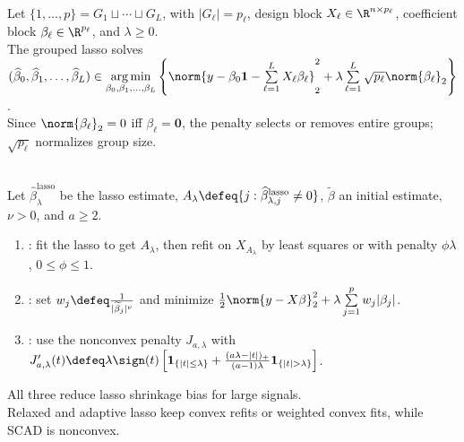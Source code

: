 \begin{method} \label{meth:sl-grouped-lasso} \\
Let $\{1,\ldots,p\}=G_1\sqcup\cdots\sqcup G_L$, with $|G_\ell|=p_\ell$, design block $X_\ell\in\R^{n\times p_\ell}$, coefficient block $\beta_\ell\in\R^{p_\ell}$, and $\lambda\geq0$.\\
The grouped lasso solves $(\widehat{\beta}_0,\widehat{\beta}_1,\ldots,\widehat{\beta}_L)\in\operatorname*{arg\,min}\limits_{\beta_0,\beta_1,\ldots,\beta_L} \left\{ \norm{y-\beta_0\mathbf{1}-\sum\limits_{\ell=1}^{L}X_\ell\beta_\ell}_2^2 +\lambda\sum\limits_{\ell=1}^{L}\sqrt{p_\ell}\norm{\beta_\ell}_2 \right\}$.\\
Since $\norm{\beta_\ell}_2=0$ iff $\beta_\ell=\mathbf{0}$, the penalty selects or removes entire groups; $\sqrt{p_\ell}$ normalizes group size.
\end{method}

\begin{method} \label{meth:sl-relaxed-adaptive-and-nonconvex-lasso-variants} \\
Let $\widehat{\beta}^{\mathrm{lasso}}_\lambda$ be the lasso estimate, $A_\lambda\defeq\{j:\widehat{\beta}^{\mathrm{lasso}}_{\lambda,j}\neq0\}$, $\widetilde{\beta}$ an initial estimate, $\nu>0$, and $a\geq2$.
\begin{enumerate}[label=(\roman*)]
\setlength{\itemsep}{0pt}
\item {}: fit the lasso to get $A_\lambda$, then refit on $X_{A_\lambda}$ by least squares or with penalty $\phi\lambda$, $0\leq\phi\leq1$.
\item {}: set $w_j\defeq\frac{1}{|\widetilde{\beta}_j|^\nu}$ and minimize $\frac{1}{2}\norm{y-X\beta}_2^2+\lambda\sum\limits_{j=1}^p w_j|\beta_j|$.
\item {}: use the nonconvex penalty $J_{a,\lambda}$ with $J'_{a,\lambda}(t)\defeq\lambda\sign(t)\left[\mathbf{1}_{\{|t|\leq\lambda\}}+\frac{(a\lambda-|t|)_+}{(a-1)\lambda}\mathbf{1}_{\{|t|>\lambda\}}\right]$.
\end{enumerate}
All three reduce lasso shrinkage bias for large signals.\\
Relaxed and adaptive lasso keep convex refits or weighted convex fits, while SCAD is nonconvex.
\end{method}

